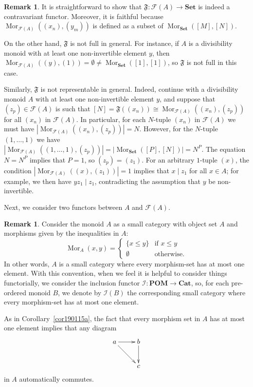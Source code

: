 \documentclass[reqno]{amsart}
\theoremstyle{plain}
\theoremstyle{definition}
\newtheorem{disc}[lem]{Remark}
\newcommand{\cat}[1]{\mathcal{#1}}
\newcommand{\catf}{\cat{F}}
\renewcommand{\leq}{\leqslant}
\newcommand{\mor}[3]{\operatorname{Mor}_{#1}(#2,#3)}
\newcommand{\catset}{\mathbf{Set}}
\newcommand{\catcat}{\mathbf{Cat}}
\newcommand{\catpom}{\mathbf{POM}}
\numberwithin{equation}{lem}
\begin{document}
\begin{disc}\label{disc170430a}
It is straightforward to show that $\mathfrak F\colon\mathcal{F}(A) \to \catset$ is indeed a contravariant functor. 
Moreover, it is faithful because
$\mor{\catf(A)}{(x_n)}{(y_m)}$ is defined as a subset of $\mor{\catset}{[M]}{[N]}$.

On the other hand, $\mathfrak F$ is not full in general. 
For instance, 
if $A$ is a divisibility monoid with at least one non-invertible element $y$, then
$\mor{\catf(A)}{(y)}{(1)}=\emptyset\neq\mor{\catset}{[1]}{[1]}$,
so $\mathfrak F$ 
is not
full in this case.

Similarly, $\mathfrak F$ is not representable in general. 
Indeed, continue with 
a divisibility monoid $A$ with at least one non-invertible element $y$, and suppose that
$(z_p)\in\catf(A)$ is such that $[N]=\mathfrak F((x_n))\cong\mor{\catf(A)}{(x_n)}{(z_p)}$ for all $(x_n)$ in
$\catf(A)$. 
In particular, for each $N$-tuple $(x_n)$ in
$\catf(A)$ we must have $|\mor{\catf(A)}{(x_n)}{(z_p)}|=N$.
However, for the $N$-tuple $(1,\ldots,1)$ we have
$|\mor{\catf(A)}{(1,\ldots,1)}{(z_p)}|=|\mor{\catset}{[P]}{[N]}|=N^P$. 
The equation $N=N^P$ implies that $P=1$, so $(z_p)=(z_1)$.
For an arbitrary $1$-tuple $(x)$, the condition
$|\mor{\catf(A)}{(x)}{(z_1)}|=1$ implies that $x\mid z_1$ for all $x\in A$;
for example, we then have $yz_1\mid z_1$, contradicting the assumption that $y$ be non-invertible.
\end{disc}

Next, we consider two functors between $A$ and 
$\catf(A)$.

\begin{disc}\label{disc171015a}
Consider the monoid $A$ as a small category with object set $A$ and morphisms
given by the inequalities in $A$:
\begin{equation*}
\mor{A}xy=
\begin{cases}
\{x\leq y\}&\text{if $x\leq y$}\\
\emptyset&\text{otherwise.}
\end{cases}
\end{equation*}
In other words, $A$ is a small category where every
morphism-set has at most one element. 
With this convention, 
when we feel it is helpful to consider things functorially,
we consider the inclusion functor $\mathcal I\colon\catpom\to\catcat$,
so, for each pre-ordered monoid $B$, we denote by $\mathcal I(B)$ the corresponding small
category where every
morphism-set has at most one element.

As in Corollary~\ref{cor190115a}, the fact that every morphism set in $A$ has at most one element
implies that any diagram
$$\xymatrix{a\ar[r]\ar[rd]&b\ar[d]\\ &c}$$
in $A$ automatically commutes.
\end{disc}
\end{document}
